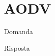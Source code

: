 \section{AODV}

\begin{questions}
    \question Domanda
    
    \begin{solution}
        Risposta
    \end{solution}
\end{questions}